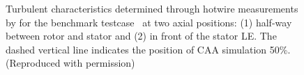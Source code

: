 \begin{figure}
	\caption{Turbulent characteristics determined through hotwire measurements by \citet{podboy_steady_2003} for the benchmark testcase~\cite{envia_panel_2015} at two axial positions: (1) half-way between rotor and stator and (2) in front of the stator LE. The dashed vertical line indicates the position of CAA simulation 50\%. (Reproduced with permission) \label{fig:hotwire}}
\end{figure}

